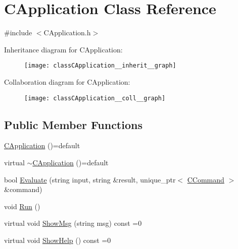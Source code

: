 \hypertarget{classCApplication}{}\section{C\+Application Class Reference}
\label{classCApplication}


{\ttfamily \#include $<$C\+Application.\+h$>$}



Inheritance diagram for C\+Application\+:\nopagebreak
\begin{figure}[H]
\begin{center}
\leavevmode
\texttt{[image: classCApplication\_\_inherit\_\_graph]}
\end{center}
\end{figure}


Collaboration diagram for C\+Application\+:\nopagebreak
\begin{figure}[H]
\begin{center}
\leavevmode
\texttt{[image: classCApplication\_\_coll\_\_graph]}
\end{center}
\end{figure}
\subsection*{Public Member Functions}
\begin{DoxyCompactItemize}
\item 
\hyperlink{classCApplication_a186bb7420ce66fadac70d2c30311b6ee}{C\+Application} ()=default
\item 
virtual \hyperlink{classCApplication_ab4448f8a90f380d4ac2afcc9ee59780d}{$\sim$\+C\+Application} ()=default
\item 
bool \hyperlink{classCApplication_ad04074e57722d0954b07ebc82298a02c}{Evaluate} (string input, string \&result, unique\+\_\+ptr$<$ \hyperlink{classCCommand}{C\+Command} $>$ \&command)
\item 
void \hyperlink{classCApplication_aa069063a23e53ea9858995f3ca34d6fb}{Run} ()
\item 
virtual void \hyperlink{classCApplication_ab88b3a17d0d6e5c14eba88fb263c9857}{Show\+Msg} (string msg) const =0
\item 
virtual void \hyperlink{classCApplication_a97b87502b1a3c7fdaa7d8ef2e7870eaf}{Show\+Help} () const =0
\end{DoxyCompactItemize}
